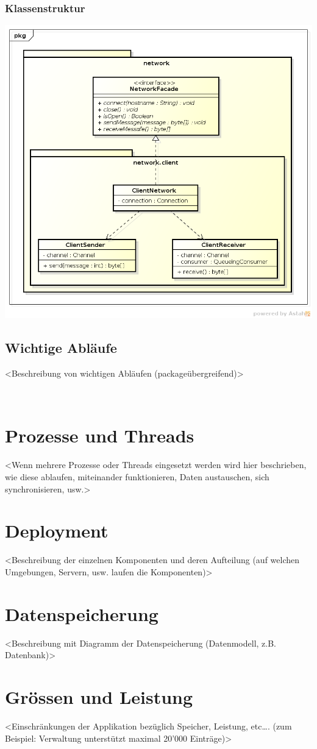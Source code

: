 \documentclass[11pt]{scrartcl}
\begin{document}
\subsubsection{Klassenstruktur}
\includegraphics[scale=0.5]{ClassDiagramNetworkClient}




















\subsection{Wichtige Abläufe}
<Beschreibung von wichtigen Abläufen (packageübergreifend)>





 
\section{Prozesse und Threads}
<Wenn mehrere Prozesse oder Threads eingesetzt werden wird hier beschrieben, wie diese ablaufen, miteinander funktionieren, Daten austauschen, sich synchronisieren, usw.>
 
\section{Deployment}
<Beschreibung der einzelnen Komponenten und deren Aufteilung (auf welchen Umgebungen, Servern, usw. laufen die Komponenten)>
 
\section{Datenspeicherung}
<Beschreibung mit Diagramm der Datenspeicherung (Datenmodell, z.B. Datenbank)>
 
\section{Grössen und Leistung}
<Einschränkungen der Applikation bezüglich Speicher, Leistung, etc…. (zum Beispiel: Verwaltung unterstützt maximal 20'000 Einträge)>
\end{document}
